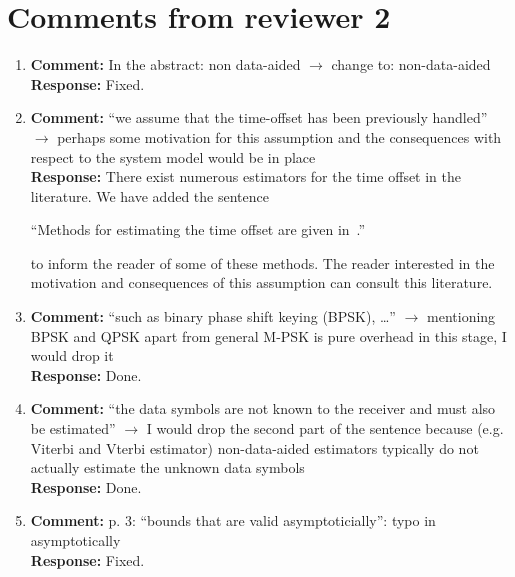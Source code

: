 \documentclass{article}
\begin{document}
\section{Comments from reviewer 2}

\begin{enumerate}

\item \textbf{Comment:} In the abstract: non data-aided $\to$ change to: non-data-aided \\
\textbf{Response:} Fixed.

\item \textbf{Comment:} ``we assume that the time-offset has been previously handled'' $\to$ perhaps some motivation for this assumption and the consequences with respect to the system model would be in place \\
\textbf{Response:}  %
There exist numerous estimators for the time offset in the literature.  We have added the sentence 

``Methods for estimating the time offset are given in~\cite{Massey1972optimumframe,Oerder_synch_square_circstat_2008,McKilliam_time_offset_pilots_data_2013}.'' 

to inform the reader of some of these methods.  The reader interested in the motivation and consequences of this assumption can consult this literature.


\item \textbf{Comment:} ``such as binary phase shift keying (BPSK), \dots'' $\to$ mentioning BPSK and QPSK apart from general M-PSK is pure overhead in this stage, I would drop it \\
\textbf{Response:} Done.

\item \textbf{Comment:} ``the data symbols are not known to the receiver and must also be estimated'' $\to$ I would drop the second part of the sentence because (e.g. Viterbi and Vterbi estimator) non-data-aided estimators typically do not actually estimate the unknown data symbols \\
\textbf{Response:} Done.

\item \textbf{Comment:} p. 3: ``bounds that are valid asymptoticially'': typo in asymptotically \\
\textbf{Response:} Fixed.


\end{enumerate}
\end{document}

